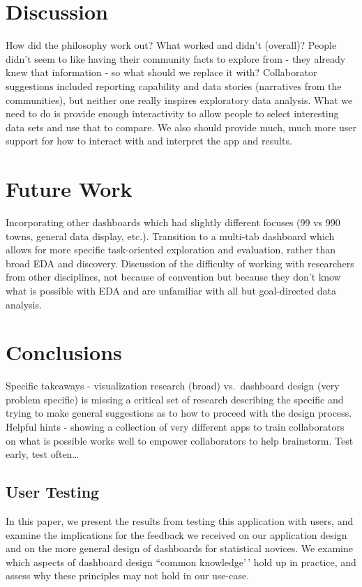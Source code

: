 \documentclass[letterpaper,inpress]{jdsart}
\begin{document}
\section{ Discussion}

How did the philosophy work out? What worked and didn't (overall)? People didn't seem to like having their community facts to explore from - they already knew that information - so what should we replace it with? Collaborator suggestions included reporting capability and data stories (narratives from the communities), but neither one really inspires exploratory data analysis. What we need to do is provide enough interactivity to allow people to select interesting data sets and use that to compare. We also should provide much, much more user support for how to interact with and interpret the app and results.

\section{ Future Work }

Incorporating other dashboards which had slightly different focuses (99 vs 990 towns, general data display, etc.). Transition to a multi-tab dashboard which allows for more specific task-oriented exploration and evaluation, rather than broad EDA and discovery.
Discussion of the difficulty of working with researchers from other disciplines, not because of convention but because they don't know what is possible with EDA and are unfamiliar with all but goal-directed data analysis.

\section {Conclusions}

Specific takeaways - visualization research (broad) vs.~dashboard design (very problem specific) is missing a critical set of research describing the specific and trying to make general suggestions as to how to proceed with the design process.
Helpful hints - showing a collection of very different apps to train collaborators on what is possible works well to empower collaborators to help brainstorm.
Test early, test often\ldots{}

\subsection{User Testing}

In this paper, we present the results from testing this application with users, and examine the implications for the feedback we received on our application design and on the more general design of dashboards for statistical novices. We examine which aspects of dashboard design ``common knowledge'\,' hold up in practice, and assess why these principles may not hold in our use-case.
\end{document}
